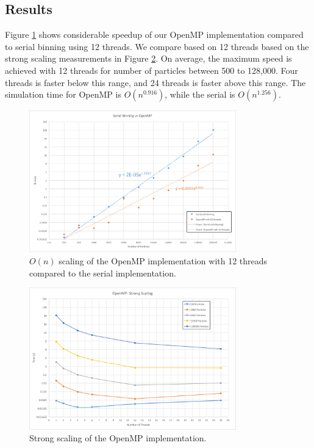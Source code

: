 \documentclass[12pt]{article}
\begin{document}
\subsection{Results}

Figure \ref{fig:openmp-on} shows considerable speedup of our OpenMP implementation compared to serial binning using 12 threads. We compare based on 12 threads based on the strong scaling measurements in Figure \ref{fig:openmp-strong}. On average, the maximum speed is achieved with 12 threads for number of particles between 500 to 128,000. Four threads is faster below this range, and 24 threads is faster above this range. The simulation time for OpenMP is $O(n^{0.916})$, while the serial is $O(n^{1.256})$. 

\begin{figure}
	\centering
\includegraphics[width=0.8\textwidth]{graphs/serial_binning_vs_openMP_12thr.png}
  \caption{$O(n)$ scaling of the OpenMP implementation with 12 threads compared to the serial implementation.}
  \label{fig:openmp-on}
\end{figure}

\begin{figure}
	\centering
\includegraphics[width=0.8\textwidth]{graphs/openmp_strong_scaling.png}
  \caption{Strong scaling of the OpenMP implementation.}
  \label{fig:openmp-strong}
\end{figure}
\end{document}
